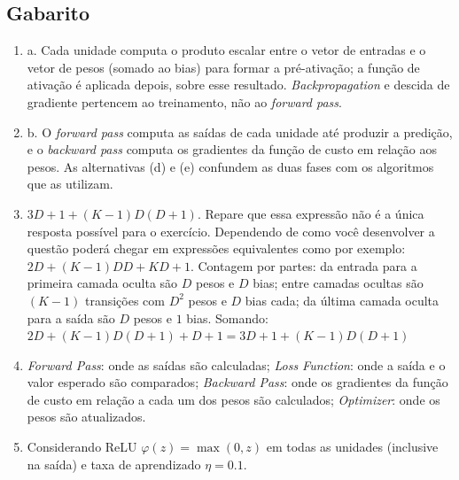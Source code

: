 \documentclass{dlproblemset}
\begin{document}
\subsection*{Gabarito}
\color{blue}
\begin{enumerate}[1)]

    \item a. Cada unidade computa o produto escalar entre o vetor de entradas e o vetor de pesos (somado ao bias) para formar a pré-ativação; a função de ativação é aplicada depois, sobre esse resultado. \textit{Backpropagation} e descida de gradiente pertencem ao treinamento, não ao \textit{forward pass}.

    \item b. O \textit{forward pass} computa as saídas de cada unidade até produzir a predição, e o \textit{backward pass} computa os gradientes da função de custo em relação aos pesos. As alternativas (d) e (e) confundem as duas fases com os algoritmos que as utilizam.

    \item $3D + 1 + (K - 1)D(D + 1)$. Repare que essa expressão não é a única resposta possível para o exercício. Dependendo de como você desenvolver a questão poderá chegar em expressões equivalentes como por exemplo: $2D + (K - 1)DD + KD + 1$. Contagem por partes: da entrada para a primeira camada oculta são $D$ pesos e $D$ bias; entre camadas ocultas são $(K-1)$ transições com $D^2$ pesos e $D$ bias cada; da última camada oculta para a saída são $D$ pesos e $1$ bias. Somando: $2D + (K-1)D(D+1) + D + 1 = 3D + 1 + (K-1)D(D+1)$

    \item \textit{Forward Pass}: onde as saídas são calculadas; \textit{Loss Function}: onde a saída e o valor esperado são comparados; \textit{Backward Pass}: onde os gradientes da função de custo em relação a cada um dos pesos são calculados; \textit{Optimizer}: onde os pesos são atualizados.

    \item Considerando ReLU $\varphi(z)=\max(0,z)$ em todas as unidades (inclusive na saída) e taxa de aprendizado $\eta = 0.1$.


\end{enumerate}
\end{document}
